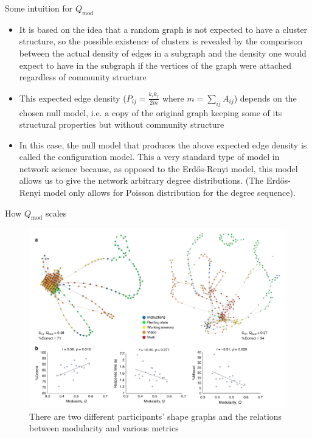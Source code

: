 \documentclass{beamer}
\begin{document}
\begin{frame}{Some intuition for $Q_{\mathrm{mod}}$}
    \begin{itemize}
        \item It is based on the idea that a random graph is not expected to have a cluster structure, so the possible existence of clusters is revealed by the comparison between the actual density of edges in a subgraph and the density one would expect to have in the subgraph if the vertices of the graph
        were attached regardless of community structure
        \item This expected edge density ($P_{ij} = \frac{k_ik_j}{2m}$ where $m = \sum_{ij}A_{ij}$) depends on the chosen null model, i.e. a copy of the original graph keeping some of its structural properties but without community structure\cite{community}\pause
        \item In this case, the null model that produces the above expected edge density is called the configuration model. This a very standard type of model in network science because, as opposed to the Erd\H{o}s-Renyi model, this model allows us to give the network arbitrary degree distributions. (The Erd\H{o}s-Renyi model only allows for Poisson distribution for the degree sequence).
    \end{itemize}
\end{frame}

\begin{frame}{How $Q_{\mathrm{mod}}$ scales}
    \begin{figure}
        \includegraphics[width = 0.75\linewidth]{fig3.png}
        \caption{There are two different participants' shape graphs and the relations between modularity and various metrics}
    \end{figure}
\end{frame}
\end{document}
